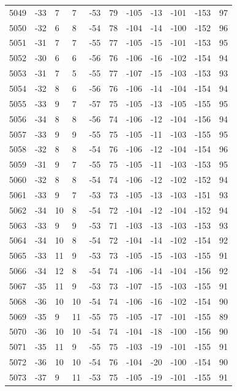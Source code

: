 \begin{table}[H]
\begin{tabular}{lllllllllll}
5049 & -33 & 7 & 7 & -53 & 79 & -105 & -13 & -101 & -153 & 97 \\
5050 & -32 & 6 & 8 & -54 & 78 & -104 & -14 & -100 & -152 & 96 \\
5051 & -31 & 7 & 7 & -55 & 77 & -105 & -15 & -101 & -153 & 95 \\
5052 & -30 & 6 & 6 & -56 & 76 & -106 & -16 & -102 & -154 & 94 \\
5053 & -31 & 7 & 5 & -55 & 77 & -107 & -15 & -103 & -153 & 93 \\
5054 & -32 & 8 & 6 & -56 & 76 & -106 & -14 & -104 & -154 & 94 \\
5055 & -33 & 9 & 7 & -57 & 75 & -105 & -13 & -105 & -155 & 95 \\
5056 & -34 & 8 & 8 & -56 & 74 & -106 & -12 & -104 & -156 & 94 \\
5057 & -33 & 9 & 9 & -55 & 75 & -105 & -11 & -103 & -155 & 95 \\
5058 & -32 & 8 & 8 & -54 & 76 & -106 & -12 & -104 & -154 & 96 \\
5059 & -31 & 9 & 7 & -55 & 75 & -105 & -11 & -103 & -153 & 95 \\
5060 & -32 & 8 & 8 & -54 & 74 & -106 & -12 & -102 & -152 & 94 \\
5061 & -33 & 9 & 7 & -53 & 73 & -105 & -13 & -103 & -151 & 93 \\
5062 & -34 & 10 & 8 & -54 & 72 & -104 & -12 & -104 & -152 & 94 \\
5063 & -33 & 9 & 9 & -53 & 71 & -103 & -13 & -103 & -153 & 93 \\
5064 & -34 & 10 & 8 & -54 & 72 & -104 & -14 & -102 & -154 & 92 \\
5065 & -33 & 11 & 9 & -53 & 73 & -105 & -15 & -103 & -155 & 91 \\
5066 & -34 & 12 & 8 & -54 & 74 & -106 & -14 & -104 & -156 & 92 \\
5067 & -35 & 11 & 9 & -53 & 73 & -107 & -15 & -103 & -155 & 91 \\
5068 & -36 & 10 & 10 & -54 & 74 & -106 & -16 & -102 & -154 & 90 \\
5069 & -35 & 9 & 11 & -55 & 75 & -105 & -17 & -101 & -155 & 89 \\
5070 & -36 & 10 & 10 & -54 & 74 & -104 & -18 & -100 & -156 & 90 \\
5071 & -35 & 11 & 9 & -55 & 75 & -103 & -19 & -101 & -155 & 91 \\
5072 & -36 & 10 & 10 & -54 & 76 & -104 & -20 & -100 & -154 & 90 \\
5073 & -37 & 9 & 11 & -53 & 75 & -105 & -19 & -101 & -155 & 91 \\

\end{tabular}
\end{table}
